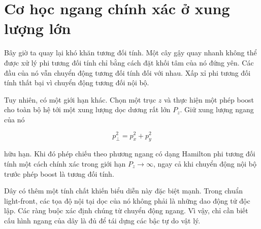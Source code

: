 \section{Cơ học ngang chính xác ở xung lượng lớn}

Bây giờ ta quay lại khó khăn tương đối tính. Một cây gậy quay nhanh không thể được xử lý phi tương đối tính chỉ bằng cách đặt khối tâm của nó đứng yên. Các đầu của nó vẫn chuyển động tương đối tính đối với nhau. Xấp xỉ phi tương đối tính thất bại vì chuyển động tương đối nội bộ.

Tuy nhiên, có một giới hạn khác. Chọn một trục \(z\) và thực hiện một phép boost cho toàn bộ hệ tới một xung lượng dọc dương rất lớn \(P_z\). Giữ xung lượng ngang của nó

\begin{equation}
  p_\perp^2=p_x^2+p_y^2
\end{equation}

hữu hạn. Khi đó phép chiếu theo phương ngang có dạng Hamilton phi tương đối tính một cách chính xác trong giới hạn \(P_z\to\infty\), ngay cả khi chuyển động nội bộ trước phép boost là tương đối tính.

\begin{classroomqa}
\end{classroomqa}

\begin{classroomqa}
\end{classroomqa}

Dây có thêm một tính chất khiến biểu diễn này đặc biệt mạnh. Trong chuẩn light-front, các tọa độ nội tại dọc của nó không phải là những dao động tử độc lập. Các ràng buộc xác định chúng từ chuyển động ngang. Vì vậy, chỉ cần biết cấu hình ngang của dây là đủ để tái dựng các bậc tự do vật lý.

